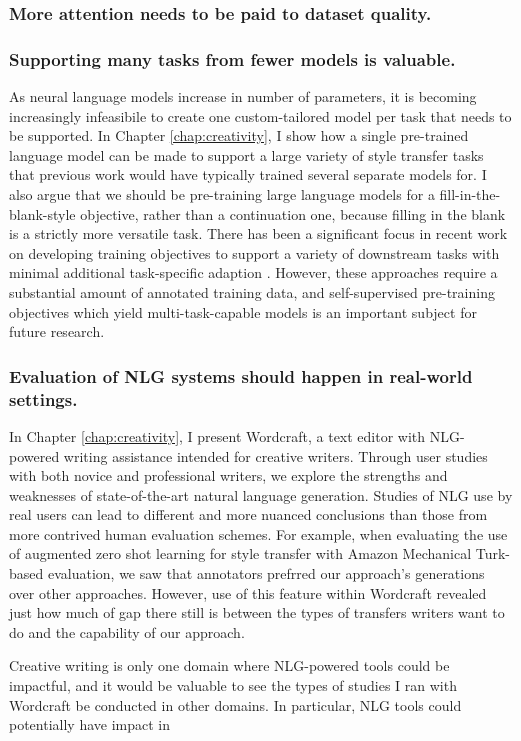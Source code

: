 \subsubsection{More attention needs to be paid to dataset quality.}
	
\subsubsection{Supporting many tasks from fewer models is valuable.}
	As neural language models increase in number of parameters, it is becoming increasingly infeasibile to create one custom-tailored model per task that needs to be supported.
	In Chapter \ref{chap:creativity}, I show how a single pre-trained language model can be made to support a large variety of style transfer tasks that previous work would have typically trained several separate models for.
	I also argue that we should be pre-training large language models for a fill-in-the-blank-style objective, rather than a continuation one, because filling in the blank is a strictly more versatile task.
	There has been a significant focus in recent work on developing training objectives to support a variety of downstream tasks with minimal additional task-specific adaption \citep{wei2021finetuned,sanh2021multitask}.
	However, these approaches require a substantial amount of annotated training data, and self-supervised pre-training objectives which yield multi-task-capable models is an important subject for future research.

\subsubsection{Evaluation of NLG systems should happen in real-world settings.}
	In Chapter \ref{chap:creativity}, I present Wordcraft, a text editor with NLG-powered writing assistance intended for creative writers.
	Through user studies with both novice and professional writers, we explore the strengths and weaknesses of state-of-the-art natural language generation.
	Studies of NLG use by real users can lead to different and more nuanced conclusions than those from more contrived human evaluation schemes.
	For example, when evaluating the use of augmented zero shot learning for style transfer with Amazon Mechanical Turk-based evaluation, we saw that annotators prefrred our approach's generations over other approaches.
	However, use of this feature within Wordcraft revealed just how much of gap there still is between the types of transfers writers want to do and the capability of our approach.

	Creative writing is only one domain where NLG-powered tools could be impactful, and it would be valuable to see the types of studies I ran with Wordcraft be conducted in other domains.
	In particular, NLG tools could potentially have impact in \TODO{}
